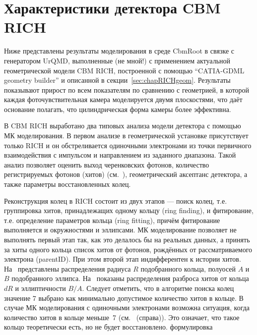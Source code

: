 \section{Характеристики детектора CBM RICH}\label{sec:secCbmRichOptimiz}

Ниже представлены результаты моделирования в среде CbmRoot в связке с генератором UrQMD, выполненные (\todo не мной!) с применением актуальной геометрической модели CBM RICH, построенной с помощью ``CATIA-GDML geometry builder'' и описанной в секции~\ref{sec:chapRICHgeom}.
Результаты показывают прирост по всем показателям по сравнению с геометрией, в которой каждая фоточувствительная камера моделируется двумя плоскостями, что даёт основание полагать, что цилиндрическая форма камеры более эффективна.

В CBM RICH выработано два типовых анализа модели детектора с помощью МК моделирования. В первом анализе в геометрической установке присутствует только RICH и он обстреливается одиночными электронами из точки первичного взаимодействия с импульсом и направлением из заданного диапазона. Такой анализ позволяет оценить выход черенковских фотонов, количество регистрируемых фотонов (хитов) (см.~), геометрический аксептанс детектора, а также параметры восстановленных колец.

Реконструкция колец в RICH состоит из двух этапов --- поиск колец, т.е. группировка хитов, принадлежащих одному кольцу (ring finding), и фитирование, т.е. определение параметров кольца (ring fitting), причём фитирование выполняется и окружностями и эллипсами.
МК моделирование позволяет не выполнять первый этап так, как это делалось бы на реальных данных, а принять за хиты одного кольца список хитов от фотонов, рождённых от рассматриваемого электрона (\todo parentID).
При этом второй этап индифферентен к истории хитов.
На~ представлены распределения радиуса $R$ подобранного кольца, полуосей $A$ и $B$ подобранного эллипса. На~ показаны распределения разброса хитов от кольца $dR$ и эллиптичности $B/A$.
Следует отметить, что в алгоритме поиска колец значение 7 выбрано как минимально допустимое количество хитов в кольце.
В случае МК моделирования с одиночными электронами возможна ситуация, когда количество хитов в кольце меньше~7 (см.~ (справа)). Это означает, что такое кольцо теоретически есть, но не будет восстановлено. \todo формулировка

